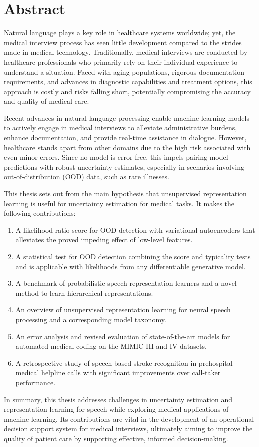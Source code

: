 
\chapter[abstract]{Abstract}

Natural language plays a key role in healthcare systems worldwide; yet, the medical interview process has seen little development compared to the strides made in medical technology. 
Traditionally, medical interviews are conducted by healthcare professionals who primarily rely on their individual experience to understand a situation. 
Faced with aging populations, rigorous documentation requirements, and advances in diagnostic capabilities and treatment options, this approach is costly and risks falling short, potentially compromising the accuracy and quality of medical care.

Recent advances in natural language processing enable machine learning models to actively engage in medical interviews to alleviate administrative burdens, enhance documentation, and provide real-time assistance in dialogue. 
However, healthcare stands apart from other domains due to the high risk associated with even minor errors. Since no model is error-free, this impels pairing model predictions with robust uncertainty estimates, especially in scenarios involving out-of-distribution (OOD) data, such as rare illnesses. 

This thesis sets out from the main hypothesis that unsupervised representation learning is useful for uncertainty estimation for medical tasks. 
It makes the following contributions:
%
\begin{enumerate}[topsep=3pt, partopsep=0pt, itemsep=3pt, parsep=0pt, leftmargin=2em, label=(\alph*)] %
    \item A likelihood-ratio score for OOD detection with variational autoencoders that alleviates the proved impeding effect of low-level features.
    \item A statistical test for OOD detection combining the score and typicality tests and is applicable with likelihoods from any differentiable generative model.
    \item A benchmark of probabilistic speech representation learners and a novel method to learn hierarchical representations.
    \item An overview of unsupervised representation learning for neural speech processing and a corresponding model taxonomy.
    \item An error analysis and revised evaluation of state-of-the-art models for automated medical coding on the MIMIC-III and IV datasets. 
    \item A retrospective study of speech-based stroke recognition in prehospital medical helpline calls with significant improvements over call-taker performance.
\end{enumerate}
%
In summary, this thesis addresses challenges in uncertainty estimation and representation learning for speech while exploring medical applications of machine learning.
Its contributions are vital in the development of an operational decision support system for medical interviews, ultimately aiming to improve the quality of patient care by supporting effective, informed decision-making.
